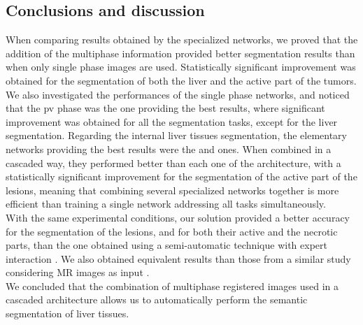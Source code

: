 \subsection{Conclusions and discussion}\label{IJCARS_conclusions_and_discussion}

When comparing results obtained by the specialized networks, we proved
that the addition of the multiphase information provided better
segmentation results than when only single phase images are used.
Statistically significant improvement was obtained for the segmentation
of both the liver and the active part of the tumors.
We also investigated the performances of the single phase networks, and
noticed that the \ac{pv} phase was the one providing the best results,
where significant improvement was obtained for all the segmentation
tasks, except for the liver segmentation.
Regarding the internal liver tissues segmentation, the elementary
networks providing the best results were the  
and  ones. When combined in a cascaded way, 
they performed better than each one of the  architecture, 
with a statistically significant improvement
for the segmentation of the active part of the lesions, meaning that 
combining several specialized networks together is more efficient 
than training a single network addressing all tasks simultaneously.\\
With the same experimental conditions, our solution provided a better
accuracy for the segmentation of the lesions, and for both their active
and the necrotic parts, than the one obtained using a semi-automatic
technique with expert interaction \cite{Ouhmich2019,Conze2017}. We also
obtained equivalent results than those from a similar study considering
MR images as input \cite{Zhang2018}.\\
We concluded that the combination of multiphase registered images used in a 
cascaded architecture allows us to automatically perform the semantic segmentation of liver tissues.

